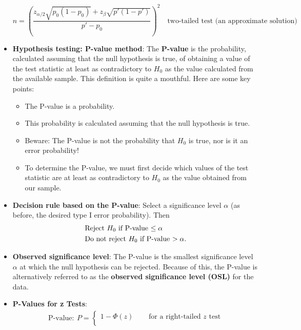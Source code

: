 \documentclass{report}
\begin{document}
\begin{itemize}
            \bigbreak \noindent 
            \[
                n = \left( \frac{z_{\alpha/2} \sqrt{p_0(1 - p_0)} + z_\beta \sqrt{p'(1 - p')}}{p' - p_0} \right)^2 \quad \text{two-tailed test (an approximate solution)}
            \]
            \item \textbf{Hypothesis testing: P-value method}:
                The \textbf{P-value} is the probability, calculated assuming that the null hypothesis is true, of obtaining a value of the test statistic at least as contradictory to $H_{0}$ as the value calculated from the available sample.
                \bigbreak \noindent 
                This definition is quite a mouthful. Here are some key points:
                \begin{itemize}
                    \item The P-value is a probability.
                    \item This probability is calculated assuming that the null hypothesis is true.
                    \item Beware: The P-value is not the probability that $H_{0}$ is true, nor is it an error probability!
                    \item To determine the P-value, we must first decide which values of the test statistic are at least as contradictory to $H_{0}$ as the value obtained from our sample.
                \end{itemize}
        \item \textbf{Decision rule based on the P-value}:
            Select a significance level $\alpha $ (as before, the desired type I error probability). Then
            \begin{align*}
                &\text{Reject $H_{0}$ if P-value $ \leq \alpha$} \\
                &\text{Do not reject $H_{0}$ if P-value $ > \alpha$} 
            .\end{align*}
        \item \textbf{Observed significance level}:
            The P-value is the smallest significance level $\alpha$ at which the null hypothesis can be rejected. Because of this, the P-value is alternatively referred to as the \textbf{observed significance level (OSL)} for the data.
        \item \textbf{P-Values for z Tests}:
            \begin{align*}
                \text{P-value}:\ P= 
                \begin{cases}
                     1-\Phi(z) & \quad \text{ for a right-tailed $z$ test}  \\

\end{cases}
\end{align*}
\end{itemize}
\end{document}
